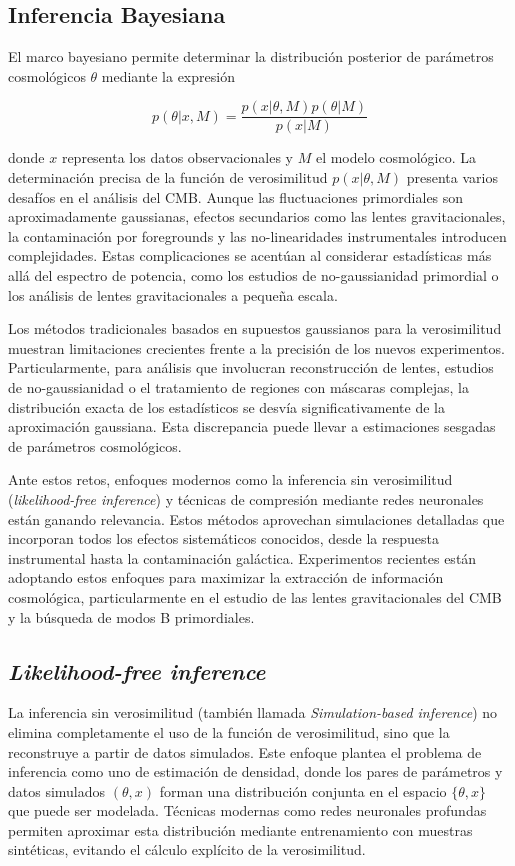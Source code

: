\documentclass[11pt]{article}
\begin{document}
\subsection{Inferencia Bayesiana}
El marco bayesiano permite determinar la distribución posterior de parámetros cosmológicos $\theta$ mediante la expresión 

\begin{equation}
p(\theta|x,M) = \frac{p(x|\theta,M)p(\theta|M)}{p(x|M)}
\end{equation}

donde $x$ representa los datos observacionales y $M$ el modelo cosmológico. La determinación precisa de la función de verosimilitud $p(x|\theta,M)$ presenta varios desafíos en el análisis del CMB. Aunque las fluctuaciones primordiales son aproximadamente gaussianas, efectos secundarios como las lentes gravitacionales, la contaminación por foregrounds y las no-linearidades instrumentales introducen complejidades. Estas complicaciones se acentúan al considerar estadísticas más allá del espectro de potencia, como los estudios de no-gaussianidad primordial o los análisis de lentes gravitacionales a pequeña escala.

Los métodos tradicionales basados en supuestos gaussianos para la verosimilitud muestran limitaciones crecientes frente a la precisión de los nuevos experimentos. Particularmente, para análisis que involucran reconstrucción de lentes, estudios de no-gaussianidad o el tratamiento de regiones con máscaras complejas, la distribución exacta de los estadísticos se desvía significativamente de la aproximación gaussiana. Esta discrepancia puede llevar a estimaciones sesgadas de parámetros cosmológicos.

Ante estos retos, enfoques modernos como la inferencia sin verosimilitud (\textit{likelihood-free inference}) y técnicas de compresión mediante redes neuronales están ganando relevancia. Estos métodos aprovechan simulaciones detalladas que incorporan todos los efectos sistemáticos conocidos, desde la respuesta instrumental hasta la contaminación galáctica. Experimentos recientes están adoptando estos enfoques para maximizar la extracción de información cosmológica, particularmente en el estudio de las lentes gravitacionales del CMB y la búsqueda de modos B primordiales.

\subsection{\textit{Likelihood-free inference}}
La inferencia sin verosimilitud (también llamada \textit{Simulation-based inference}) no elimina completamente el uso de la función de verosimilitud, sino que la reconstruye a partir de datos simulados. Este enfoque plantea el problema de inferencia como uno de estimación de densidad, donde los pares de parámetros y datos simulados $(\theta, x)$ forman una distribución conjunta en el espacio $\{\theta, x\}$ que puede ser modelada. Técnicas modernas como redes neuronales profundas permiten aproximar esta distribución mediante entrenamiento con muestras sintéticas, evitando el cálculo explícito de la verosimilitud.
\end{document}
